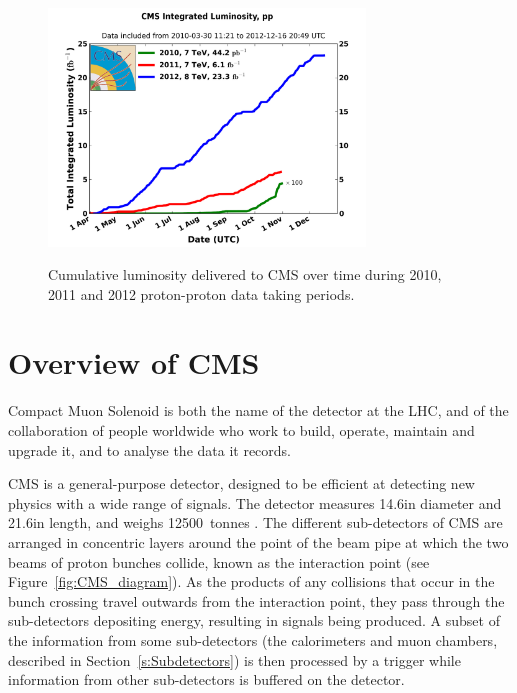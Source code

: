 \begin{figure}[hbtp]
   \centering
     \includegraphics[width=0.75\textwidth]{Chapters/02_Detector/Images/int_lumi_cumulative_pp_2.png}\\
     \caption[Cumulative luminosity delivered to CMS during 2010, 2011 and 2012.]{Cumulative luminosity
     delivered to CMS over time during 2010, 2011 and 2012 proton-proton data taking periods.}
     \label{fig:integrated_luminosity}
\end{figure}

\section{Overview of CMS}
\label{s:Overview}
Compact Muon Solenoid is both the name of the detector at the LHC, and of the collaboration of people
worldwide who work to build, operate, maintain and upgrade it, and to analyse the data it records.

CMS is a general-purpose detector, designed to be efficient at detecting new physics with a wide range of
signals. The detector measures 14.6\m in diameter and 21.6\m in length, and weighs 12500~tonnes
\cite{CMS_experiment}. The different sub-detectors of CMS are arranged in concentric layers around the point
of the beam pipe at which the two beams of proton bunches collide, known as the interaction point (see
Figure~\ref{fig:CMS_diagram}). As the products of any collisions that occur in the bunch crossing travel
outwards from the interaction point, they pass through the sub-detectors depositing energy, resulting in
signals being produced. A subset of the information from some sub-detectors (the calorimeters and muon
chambers, described in Section~\ref{s:Subdetectors}) is then processed by a trigger while information from
other sub-detectors is buffered on the detector.

